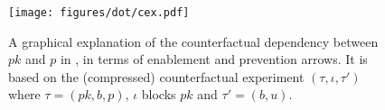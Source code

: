 \begin{figure}
  \vspace*{-0.5cm}
  \begin{center}
    \texttt{[image: figures/dot/cex.pdf]}
  \end{center}
  \vspace{-0.8cm}
  \caption{A graphical explanation of the counterfactual dependency
    between $pk$ and $p$ in \protect\RefTrace{}, in
    terms of enablement and prevention arrows. It is based on the
    (compressed) counterfactual experiment $(\tau, \iota, \tau')$ where
    $\tau = (pk, b, p)$, $\iota$ blocks $pk$ and $\tau' = (b, u)$.}
  \label{fig:cex}
\end{figure}
